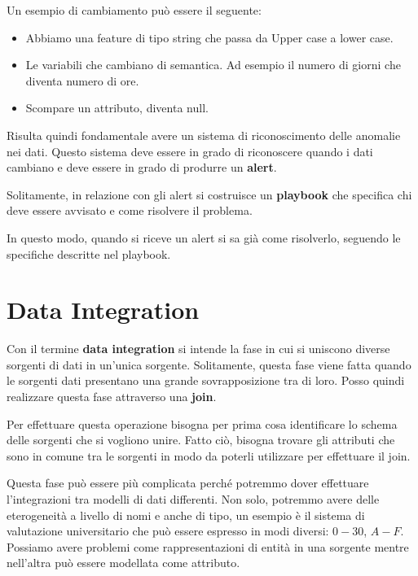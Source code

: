 Un esempio di cambiamento può essere il seguente:
\begin{itemize}
      \item Abbiamo una feature di tipo string che passa da Upper case a lower case.
      \item Le variabili che cambiano di semantica. Ad esempio il numero di giorni
            che diventa numero di ore.
      \item Scompare un attributo, diventa null.
\end{itemize}
Risulta quindi fondamentale avere un sistema di riconoscimento delle anomalie
nei dati. Questo sistema deve essere in grado di riconoscere quando i dati cambiano
e deve essere in grado di produrre un \textbf{alert}.

Solitamente, in relazione con gli alert si costruisce un \textbf{playbook} che
specifica chi deve essere avvisato e come risolvere il problema.

In questo modo, quando si riceve un alert si sa già come risolverlo, seguendo
le specifiche descritte nel playbook.

\section{Data Integration}
Con il termine \textbf{data integration} si intende la fase in cui si uniscono
diverse sorgenti di dati in un'unica sorgente. Solitamente, questa fase viene
fatta quando le sorgenti dati presentano una grande sovrapposizione tra di loro.
Posso quindi realizzare questa fase attraverso una \textbf{join}.

Per effettuare questa operazione bisogna per prima cosa identificare lo schema
delle sorgenti che si vogliono unire. Fatto ciò, bisogna trovare gli attributi
che sono in comune tra le sorgenti in modo da poterli utilizzare per effettuare
il join.

Questa fase può essere più complicata perché potremmo dover effettuare l'integrazioni
tra modelli di dati differenti. Non solo, potremmo avere delle eterogeneità a livello
di nomi e anche di tipo, un esempio è il sistema di valutazione universitario
che può essere espresso in modi diversi: $0-30$, $A-F$. Possiamo avere problemi
come rappresentazioni di entità in una sorgente mentre nell'altra può essere
modellata come attributo.

